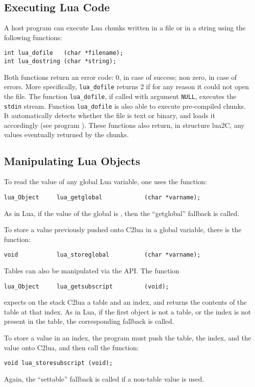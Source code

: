 \subsection{Executing Lua Code}
A host program can execute Lua chunks written in a file or in a string
using the following functions:
\begin{verbatim}
int lua_dofile   (char *filename);
int lua_dostring (char *string);
\end{verbatim}
Both functions return an error code:
0, in case of success; non zero, in case of errors.
More specifically, \verb'lua_dofile' returns 2 if for any reason
it could not open the file.
The function \verb'lua_dofile', if called with argument \verb'NULL',
executes the \verb|stdin| stream.
Function \verb'lua_dofile' is also able to execute pre-compiled chunks.
It automatically detects whether the file is text or binary,
and loads it accordingly (see program ).
These functions also return, in structure lua2C,
any values eventually returned by the chunks.


\subsection{Manipulating Lua Objects}
To read the value of any global Lua variable,
one uses the function:
\begin{verbatim}
lua_Object     lua_getglobal            (char *varname);
\end{verbatim}
As in Lua, if the value of the global is \nil,
then the ``getglobal'' fallback is called.

To store a value previously pushed onto C2lua in a global variable,
there is the function:
\begin{verbatim}
void           lua_storeglobal          (char *varname);
\end{verbatim}

Tables can also be manipulated via the API.
The function
\begin{verbatim}
lua_Object     lua_getsubscript         (void);
\end{verbatim}
expects on the stack C2lua a table and an index,
and returns the contents of the table at that index.
As in Lua, if the first object is not a table,
or the index is not present in the table,
the corresponding fallback is called.

To store a value in an index,
the program must push the table, the index,
and the value onto C2lua,
and then call the function:
\begin{verbatim}
void lua_storesubscript (void);
\end{verbatim}
Again, the ``settable'' fallback is called if a non-table value is used.

